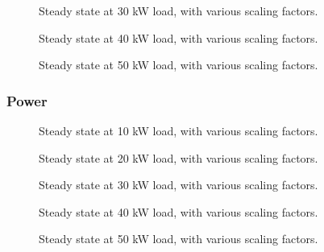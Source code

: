 \begin{figure}[H]
\centering

\caption{Steady state at 30 kW load, with various scaling factors.}
\label{fig:test11-14steadyfrequency30kw}
\end{figure}

\begin{figure}[H]
\centering

\caption{Steady state at 40 kW load, with various scaling factors.}
\label{fig:test11-14steadyfrequency40kw}
\end{figure}

\begin{figure}[H]
\centering

\caption{Steady state at 50 kW load, with various scaling factors.}
\label{fig:test11-14steadyfrequency50kw}
\end{figure}

\subsubsection{Power}
\begin{figure}[H]
\centering

\caption{Steady state at 10 kW load, with various scaling factors.}
\label{fig:test11-14steadypower10kw}
\end{figure}

\begin{figure}[H]
\centering

\caption{Steady state at 20 kW load, with various scaling factors.}
\label{fig:test11-14steadypower20kw}
\end{figure}

\begin{figure}[H]
\centering

\caption{Steady state at 30 kW load, with various scaling factors.}
\label{fig:test11-14steadypower30kw}
\end{figure}

\begin{figure}[H]
\centering

\caption{Steady state at 40 kW load, with various scaling factors.}
\label{fig:test11-14steadypower40kw}
\end{figure}

\begin{figure}[H]
\centering

\caption{Steady state at 50 kW load, with various scaling factors.}
\label{fig:test11-14steadypower50kw}
\end{figure}

